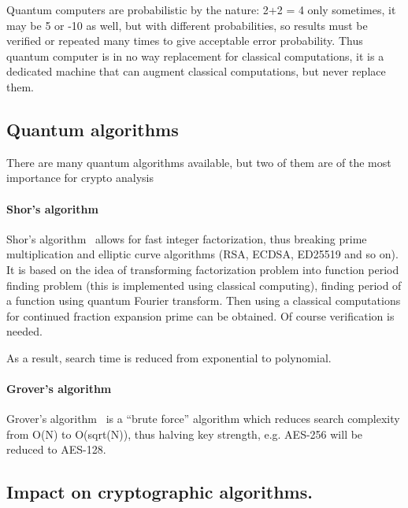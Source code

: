 \documentclass[10pt, a5paper]{article}
\begin{document}
Quantum computers are probabilistic by the nature: 2+2 = 4 only sometimes, it may be 5 or -10 as well, but with different probabilities, so results must be verified or repeated many times to give acceptable error probability. Thus quantum computer is in no way replacement for classical computations, it is a dedicated machine that can augment classical computations, but never replace them.

\subsection*{Quantum algorithms}

There are many quantum algorithms available, but two of them are of the most importance for crypto analysis

\paragraph{Shor's algorithm}

Shor's algorithm~\cite{Savchenko2} allows for fast integer \linebreak factorization, thus breaking prime multiplication and elliptic curve \linebreak algorithms (RSA, ECDSA, ED25519 and so on). It is based on the idea of transforming factorization problem into function period finding problem (this is implemented using classical computing), finding period of a function using quantum Fourier transform. Then using a classical computations for continued fraction expansion prime can be obtained. Of course verification is needed.

As a result, search time is reduced from exponential to polynomial.

\paragraph{Grover's algorithm}

Grover's algorithm~\cite{Savchenko3} is a ``brute force'' algorithm which reduces search complexity from O(N) to O(sqrt(N)), thus halving key strength, e.g. AES-256 will be reduced to AES-128.

\subsection*{Impact on cryptographic algorithms.}
\end{document}
